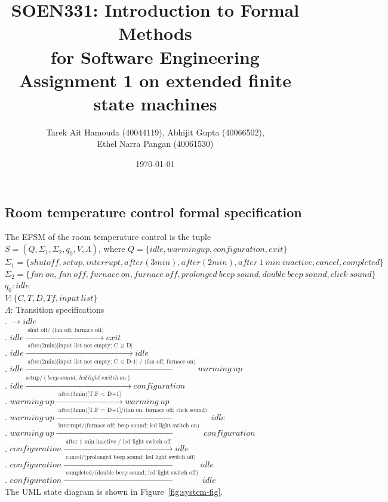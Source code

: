 \documentclass[12pt]{article}
\title{SOEN331: Introduction to Formal Methods\\for Software Engineering\\
Assignment 1 on extended finite state machines}
\author{Tarek Ait Hamouda (40044119), Abhijit Gupta (40066502),\\ 
Ethel Narra Pangan (40061530)}
\date{\today}
\begin{document}
\begin{spacing}{1.5}

\maketitle

\section{Room temperature control formal specification}

\noindent The EFSM of the room temperature control is the tuple $S = (Q, \Sigma_1, \Sigma_2, q_0, V, \Lambda)$, where
\noindent $Q = \{idle, warming up, configuration, exit\}$\\
\noindent $\Sigma_1 = \{shut off, setup, interrupt, after(3min), after(2min), after~1~min~inactive, cancel, completed\}$\\
\noindent $\Sigma_2 = \{fan~on, fan~off, furnace~on, furnace~off, prolonged~beep~sound, double~beep~sound, click~sound\}$\\
\noindent $q_0: idle$\\
\noindent $V: \{C, T, D, Tf, input~list\}$\\
\noindent $\Lambda$: Transition specifications\\
. $\rightarrow idle$\\
. $idle \xrightarrow {\text { shut off/ (fan off; furnace off)}} exit$\\
. $idle \xrightarrow {\text { after(2min)[input list not empty; C $\geq$ D]}} idle$\\
. $idle \xrightarrow {\text { after(2min)[input list not empty; C $\leq$ D-1] / (fan off; furnace on)}} warming~up$\\
. $idle \xrightarrow {\text {setup}/(beep~sound;~led~light~switch~on)} configuration$\\
. $warming~up \xrightarrow {\text { after(3min)[T.F $<$ D+1] }} warming~up$\\
. $warming~up \xrightarrow {\text { after(3min)[T.F $=$ D+1]/(fan on; furnace off; click sound) }} idle$\\
. $warming~up \xrightarrow {\text { interrupt/(furnace off; beep sound; led light switch on)  }} configuration$\\
. $configuration \xrightarrow {\text { after 1 min inactive / led light switch off }} idle$\\
. $configuration \xrightarrow {\text { cancel/(prolonged beep sound; led light switch off) }} idle$\\
. $configuration \xrightarrow {\text { completed/(double beep sound; led light switch off) }} idle$\\
\noindent The UML state diagram is shown in Figure~\ref{fig:system-fig}.\\\\


\end{spacing}
\end{document}
